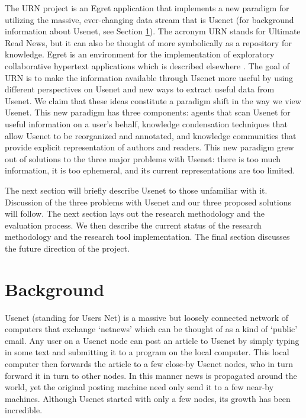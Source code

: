 The URN project is an Egret application that implements a new paradigm for
utilizing the massive, ever-changing data stream that is Usenet (for
background information about Usenet, see Section \ref{background}). The
acronym URN stands for Ultimate Read News, but it can also be thought of
more symbolically as a repository for knowledge. Egret is an environment for
the implementation of exploratory collaborative hypertext applications which
is described elsewhere \cite{csdl-91-03,csdl-92-01}. The goal of URN is to
make the information available through Usenet more useful by using different
perspectives on Usenet and new ways to extract useful data from Usenet. We
claim that these ideas constitute a paradigm shift in the way we view
Usenet. This new paradigm has three components: agents that scan Usenet for
useful information on a user's behalf, knowledge condensation techniques
that allow Usenet to be reorganized and annotated, and knowledge communities
that provide explicit representation of authors and readers. This new
paradigm grew out of solutions to the three major problems with Usenet:
there is too much information, it is too ephemeral, and its current
representations are too limited.

The next section will briefly describe Usenet to those unfamiliar with it. 
Discussion of the three problems with Usenet and our three proposed
solutions will follow. The next section lays out the research methodology
and the evaluation process. We then describe the current status of the
research methodology and the research tool implementation. The final section
discusses the future direction of the project.

\section{Background}
\label{background}

Usenet (standing for Users Net) is a massive but loosely connected network of
computers that exchange `netnews' which can be thought of as a kind of
`public' email. Any user on a Usenet node can post an article to Usenet by
simply typing in some text and submitting it to a program on the local
computer. This local computer then forwards the article to a few close-by
Usenet nodes, who in turn forward it in turn to other nodes. In this manner
news is propagated around the world, yet the original posting machine need
only send it to a few near-by machines. Although Usenet started with only a
few nodes, its growth has been incredible.

